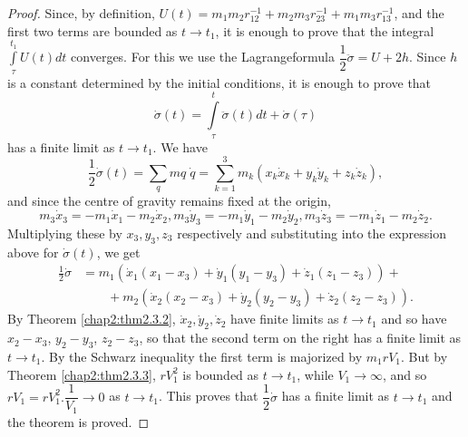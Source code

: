 \begin{proof}
Since, by definition, $U(t) = m_1 m_2 r^{-1}_{12} + m_2 m_3 r^{-1}_{23} + m_1 m_3 r^{-1}_{13}$, and the first two terms are bounded as $t \to t_1$, it is enough to prove that the integral $\int\limits^{t_1}_{\tau} U(t)dt$ converges. For this we use the Lagrange\pageoriginale formula $\dfrac{1}{2} \ddot{\sigma} = U + 2h$. Since $h$ is a constant determined by the initial conditions, it is enough to prove that
$$
\dot{\sigma} (t) = \int\limits^t_{\tau} \ddot{\sigma} (t) dt + \dot{\sigma} (\tau)
$$
has a finite limit as $t \to t_1$. We have 
$$
\frac{1}{2} \dot{\sigma} (t) = \sum\limits_q mq \; \dot{q} = \sum\limits^3_{k=1} m_k (x_k \dot{x}_k + y_k \dot{y}_k + z_k \dot{z}_k),
$$
and since the centre of gravity remains fixed at the origin,
$$
m_3 \dot{x}_3 = - m_1 \dot{x}_1 - m_2 \dot{x}_2, m_3 \dot{y}_3 = - m_1 \dot{y}_1 - m_2 \dot{y}_2, m_3 \dot{z}_3 = - m_1 \dot{z}_1 - m_2 \dot{z}_2.
$$
Multiplying these by $x_3, y_3, z_3$ respectively and substituting into the expression above for $\dot{\sigma} (t)$, we get
\begin{align*}
\frac{1}{2} \dot{\sigma} & = m_1(\dot{x}_1 (x_1 - x_3) + \dot{y}_1 (y_1 - y_3) + \dot{z}_1 (z_1 - z_3)) + \\
& \qquad + m_2 (\dot{x}_2 (x_2 - x_3) + \dot{y}_2 (y_2 - y_3) + \dot{z}_2 (z_2 - z_3)). 
\end{align*}
By Theorem \ref{chap2:thm2.3.2}, $\dot{x}_2, \dot{y}_2, \dot{z}_2$ have finite limits as $t \to t_1$ and so have $x_2 - x_3$, $y_2 - y_3$, $z_2 - z_3$, so that the second term on the right has a finite limit as $t \to t_1$. By the Schwarz inequality the first term is majorized by $m_1 r V_1$. But by Theorem \ref{chap2:thm2.3.3}, $rV^2_1$ is bounded as $t \to t_1$, while $V_1 \to \infty$, and so $rV_1 = rV^2_1. \dfrac{1}{V_1} \to 0$ as $t \to t_1$. This proves that $\dfrac{1}{2} \dot{\sigma}$ has a finite limit as $t \to t_1$ and the theorem is proved.
\end{proof}

